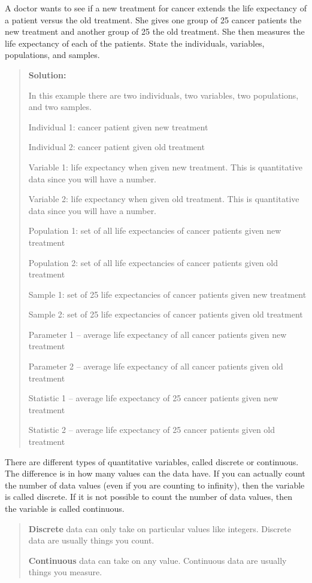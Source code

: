 \documentclass[]{book}
\begin{document}
A doctor wants to see if a new treatment for cancer extends the life expectancy of a patient versus the old treatment. She gives one group of 25 cancer patients the new treatment and another group of 25 the old treatment. She then measures the life expectancy of each of the patients. State the individuals, variables, populations, and samples.

\begin{quote}
\textbf{Solution:}

In this example there are two individuals, two variables, two populations, and two samples.

Individual 1: cancer patient given new treatment

Individual 2: cancer patient given old treatment

Variable 1: life expectancy when given new treatment. This is quantitative data since you will have a number.

Variable 2: life expectancy when given old treatment. This is quantitative data since you will have a number.

Population 1: set of all life expectancies of cancer patients given new treatment

Population 2: set of all life expectancies of cancer patients given old treatment

Sample 1: set of 25 life expectancies of cancer patients given new treatment

Sample 2: set of 25 life expectancies of cancer patients given old treatment

Parameter 1 -- average life expectancy of all cancer patients given new treatment

Parameter 2 -- average life expectancy of all cancer patients given old treatment

Statistic 1 -- average life expectancy of 25 cancer patients given new treatment

Statistic 2 -- average life expectancy of 25 cancer patients given old treatment
\end{quote}

There are different types of quantitative variables, called discrete or continuous. The difference is in how many values can the data have. If you can actually count the number of data values (even if you are counting to infinity), then the variable is called discrete. If it is not possible to count the number of data values, then the variable is called continuous.

\begin{quote}
\textbf{Discrete} data can only take on particular values like integers. Discrete data are usually things you count.

\textbf{Continuous} data can take on any value. Continuous data are usually things you measure.
\end{quote}
\end{document}
